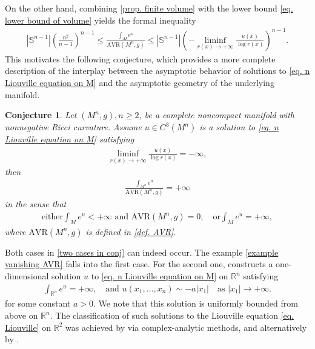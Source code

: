 \documentclass[12pt]{amsart}
\theoremstyle{plain}
\newtheorem{conjecture}[theorem]{Conjecture}
\theoremstyle{definition}
\theoremstyle{remark}     %
\begin{document}
On the other hand, combining \cref{prop. finite volume} with the lower bound \cref{eq. lower bound of volume} yields the formal inequality
\begin{align*}
    |\mathbb{S}^{n-1}|
    \left(\frac{n^2}{n-1}\right)^{n-1}
    \leq \frac{\int_M e^u}{\mathrm{AVR}(M^n,g)}
    \leq |\mathbb{S}^{n-1}|
    \left(-\liminf_{r(x)\to+\infty}
    \frac{u(x)}{\log r(x)}
    \right)^{n-1}.
\end{align*}
 This motivates the following conjecture, which provides a more complete description of the interplay between the asymptotic behavior of solutions to \cref{eq. n Liouville equation on M} and the asymptotic geometry of the underlying manifold.
 \begin{conjecture}\label{conj. converse of prop}
      Let $(M^n,g), n\geq 2$, be a complete noncompact manifold with nonnegative Ricci curvature. Assume $u\in C^3(M^n)$ is a solution to \cref{eq. n Liouville equation on M}
    satisfying
    \begin{align}\label{eq. sub-logarithmic decay}
        \liminf_{r(x)\to+\infty}
        \frac{u(x)}{\log r(x)}
        =-\infty,
    \end{align}
    then
    \begin{align*}
        \frac{\int_{M^n}e^u}{\mathrm{AVR}(M^n,g)}=+\infty
    \end{align*}
    in the sense that
    \begin{align}\label{two cases in conj}
        \text{either} \int_M e^u<+\infty \text{ and } 
        \mathrm{AVR}(M^n,g)=0,\quad
        \text{or} \int_M e^u=+\infty,
    \end{align}
    where $\mathrm{AVR}(M^n,g)$ is defined in \cref{def. AVR}.
 \end{conjecture}

 
Both cases in \cref{two cases in conj} can indeed occur.
The example \cref{example vanishing AVR}  falls into the first case. For the second one, \cite[Example 4.6]{CMR26} constructs a one-dimensional solution $u$ to \cref{eq. n Liouville equation on M} on $\mathbb{R}^n$ satisfying 
\begin{align*}
    \int_{\mathbb{R}^n}e^u=+\infty,\quad 
    \text{and }
    u(x_1,\dots,x_n)\sim -a|x_1| \quad 
    \text{as }|x_1|\to +\infty.
\end{align*}
for some constant $a>0$. We note that this solution is uniformly bounded from above on $\mathbb{R}^n$. The classification of such solutions to the Liouville equation \cref{eq. Liouville} on $\mathbb{R}^2$ was achieved by \cite[Theorem 1.6]{EGLX25} via complex-analytic methods, and alternatively by \cite{CLZ26}.
\end{document}
